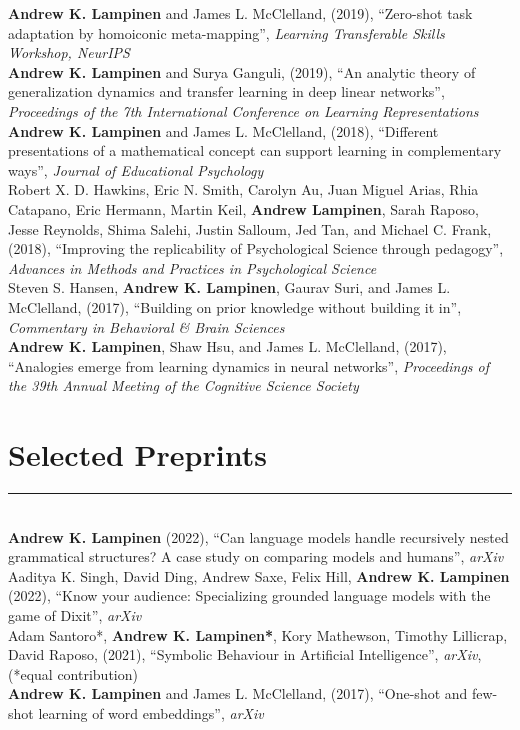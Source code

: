 \documentclass[margin]{res}
\begin{document}
\begin{resume}
\textbf{Andrew K. Lampinen} and James L. McClelland, (2019), {``Zero-shot task adaptation by homoiconic meta-mapping'',} \textit{Learning Transferable Skills Workshop, NeurIPS} \\ [3pt] 
\textbf{Andrew K. Lampinen} and Surya Ganguli, (2019), {``An analytic theory of generalization dynamics and transfer learning in deep linear networks'',} \textit{Proceedings of the 7th International Conference on Learning Representations} \\[3pt] 
\textbf{Andrew K. Lampinen} and James L. McClelland, (2018), {``Different presentations of a mathematical concept can support learning in complementary ways'',} \textit{Journal of Educational Psychology} \\[3pt]
 Robert X. D. Hawkins, Eric N. Smith, Carolyn Au, Juan Miguel Arias, Rhia Catapano, Eric Hermann, Martin Keil, \textbf{Andrew Lampinen}, Sarah Raposo, Jesse Reynolds, Shima Salehi, Justin Salloum, Jed Tan, and Michael C. Frank, (2018), {``Improving the replicability of Psychological Science through pedagogy'',}  \textit{Advances in Methods and Practices in Psychological Science} \\ [3pt]
Steven S. Hansen, \textbf{Andrew K. Lampinen}, Gaurav Suri, and James L. McClelland, (2017), {``Building on prior knowledge without building it in'',} \textit{Commentary in Behavioral \& Brain Sciences}  \\[3pt]
\textbf{Andrew K. Lampinen}, Shaw Hsu, and James L. McClelland, (2017), {``Analogies emerge from learning dynamics in neural networks'',} \textit{Proceedings of the 39th Annual Meeting of the Cognitive Science Society}  

\vspace{1pt}\section{Selected\phantom{blah} Preprints} \vspace{-15pt} \rule{\textwidth}{0.5pt} \\[3pt]
\textbf{Andrew K. Lampinen} (2022), {``Can language models handle recursively nested grammatical structures? A case study on comparing models and humans'',} \textit{arXiv} \\[3pt]
Aaditya K. Singh, David Ding, Andrew Saxe, Felix Hill, \textbf{Andrew K. Lampinen} (2022), {``Know your audience: Specializing grounded language models with the game of Dixit'',} \textit{arXiv} \\[3pt] 
Adam Santoro*, \textbf{Andrew K. Lampinen*}, Kory Mathewson, Timothy Lillicrap, David Raposo, (2021), {``Symbolic Behaviour in Artificial Intelligence'',} \textit{arXiv}, (*equal contribution) \\[3pt] 
\textbf{Andrew K. Lampinen} and James L. McClelland, (2017), {``One-shot and few-shot learning of word embeddings'',} \textit{arXiv} 


\end{resume}
\end{document}
